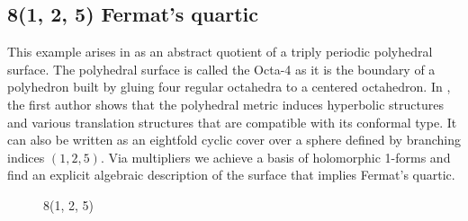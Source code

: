 \documentclass[12pt,reqno]{amsart}
\theoremstyle{definition}
\theoremstyle{remark}
\begin{document}
\subsection*{8(1, 2, 5) Fermat's quartic}

This example arises in \cite{dami} as an abstract quotient of a triply periodic polyhedral surface. The polyhedral surface is called the Octa-4 as it is the boundary of a polyhedron built by gluing four regular octahedra to a centered octahedron. In \cite{dami}, the first author shows that the polyhedral metric induces hyperbolic structures and various translation structures that are compatible with its conformal type. It can also be written as an eightfold cyclic cover over a sphere defined by branching indices $(1, 2, 5).$ Via multipliers we achieve a basis of holomorphic 1-forms and ﬁnd an explicit algebraic description of the surface that implies Fermat's quartic. 


\begin{figure}[htbp]
    \centering
    \qquad
    \caption{8(1, 2, 5)}%
    \label{fig:125}%
\end{figure}
\end{document}

